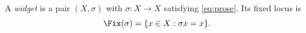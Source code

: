 \begin{definition}[Widget]\label{sy-0001}
A \emph{widget} is a pair $(X,\sigma)$ with $\sigma\colon X\to X$ satisfying \eqref{eq:prose}. Its fixed locus is
\begin{equation}\label{eq:fix}
\Fix(\sigma) = \{x \in X : \sigma x = x\}.
\end{equation}
\end{definition}